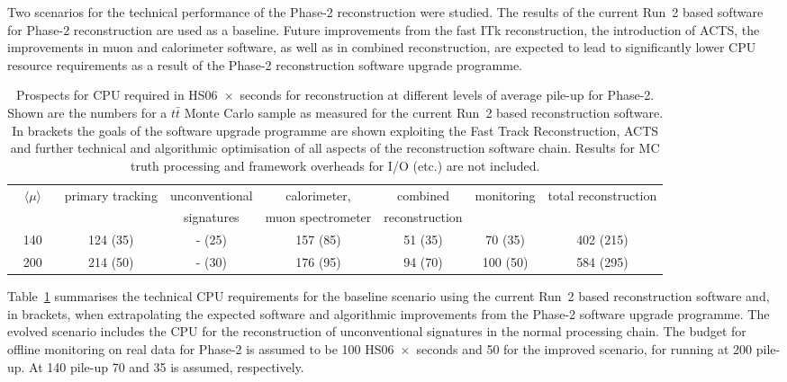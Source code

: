 Two scenarios for the technical performance of the Phase-2 reconstruction were studied. The results of the current Run~2 based software for Phase-2 reconstruction are used as a baseline. Future improvements from the fast ITk reconstruction, the introduction of ACTS, the improvements in muon and calorimeter software, as well as in combined reconstruction, are expected to lead to significantly lower CPU resource requirements as a result of the Phase-2 reconstruction software upgrade programme.
%
\begin{table}[htb!]
  \caption{Prospects for CPU required in HS06~$\times$~seconds for reconstruction at different levels of average pile-up for Phase-2. Shown are the numbers for a $t\bar{t}$ Monte Carlo sample as measured for the current Run~2 based reconstruction software. In brackets the goals of the software upgrade programme are shown exploiting the Fast Track Reconstruction, ACTS and further technical and algorithmic optimisation of all aspects of the reconstruction software chain. Results for MC truth processing and framework overheads for I/O (etc.) are not included.}
  \label{tab:Phase2CPU}
  \centering
  \begin{tabular}{|c||c|c|c|c|c||c|} \hline
    \,\,\,\,\,$\langle\mu\rangle$\,\,\,\,\, & primary tracking & unconventional & calorimeter,      & combined       & monitoring & total reconstruction \\
                        &                  & signatures     & muon spectrometer & reconstruction &            &       \\ \hline
    140                 & 124 (35) & - (25)         & 157 (85)          & 51 (35)        & 70 (35)    & 402 (215)  \\
    200                 & 214 (50) & - (30)         & 176 (95)          & 94 (70)        & 100 (50)   & 584 (295) \\ \hline
    \end{tabular}
\end{table}

Table~\ref{tab:Phase2CPU} summarises the technical CPU requirements for the baseline scenario using the current Run~2 based reconstruction software and, in brackets, when extrapolating the expected software and algorithmic improvements from the Phase-2 software upgrade programme. The evolved scenario includes the CPU for the reconstruction of unconventional signatures in the normal processing chain. The budget for offline monitoring on real data for Phase-2 is assumed to be 100 HS06~$\times$~seconds and 50 for the improved scenario, for running at 200 pile-up. At 140 pile-up 70 and 35 is assumed, respectively.

